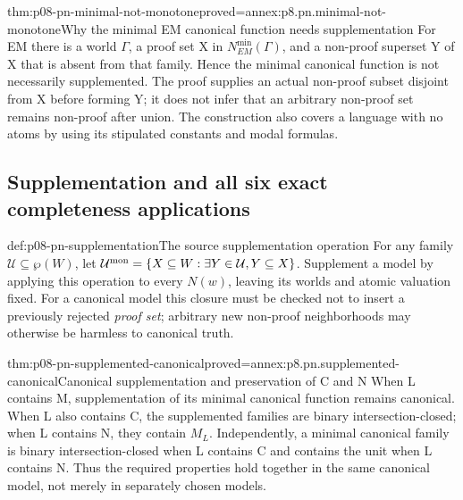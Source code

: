 \begin{hbtheorem}{thm:p08-pn-minimal-not-monotone}{proved=annex:p8.pn.minimal-not-monotone}{Why the minimal EM canonical function needs supplementation}
For EM there is a world \(\Gamma\), a proof set X in
\(N^{\min}_{EM}(\Gamma)\), and a non-proof superset Y of X
that is absent from that family. Hence the minimal canonical
function is not necessarily supplemented. The proof supplies an
actual non-proof subset disjoint from X before forming Y; it does
not infer that an arbitrary non-proof set remains non-proof after
union. The construction also covers a language with no atoms by
using its stipulated constants and modal formulas.
\end{hbtheorem}

\subsection{Supplementation and all six exact completeness applications}

\begin{hbdefinition}{def:p08-pn-supplementation}{The source supplementation operation}
For any family \(\mathcal U\subseteq\wp(W)\), let
\(\mathcal U^{\rm mon}=\{X\subseteq W:\exists Y\in\mathcal U,
Y\subseteq X\}\). Supplement a model by applying this operation
to every \(N(w)\), leaving its worlds and atomic valuation fixed.
For a canonical model this closure must be checked not to insert
a previously rejected \emph{proof set}; arbitrary new non-proof
neighborhoods may otherwise be harmless to canonical truth.
\end{hbdefinition}

\begin{hbtheorem}{thm:p08-pn-supplemented-canonical}{proved=annex:p8.pn.supplemented-canonical}{Canonical supplementation and preservation of C and N}
When L contains M, supplementation of its minimal canonical
function remains canonical. When L also contains C, the supplemented
families are binary intersection-closed; when L contains N, they
contain \(M_L\). Independently, a minimal canonical family is
binary intersection-closed when L contains C and contains the unit
when L contains N. Thus the required properties hold together in
the same canonical model, not merely in separately chosen models.
\end{hbtheorem}

